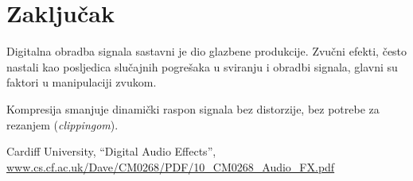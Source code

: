 \documentclass[conference]{IEEEtran}
\begin{document}
\section{Zaključak}
Digitalna obradba signala sastavni je dio glazbene produkcije. Zvučni efekti, često nastali kao
posljedica slučajnih pogrešaka u sviranju i obradbi signala, glavni su faktori u manipulaciji zvukom.

Kompresija smanjuje dinamički raspon signala bez distorzije, bez potrebe za rezanjem
(\textit{clippingom}).

\begin{thebibliography}{00}
 Cardiff University, ``Digital Audio Effects'',
	\url{www.cs.cf.ac.uk/Dave/CM0268/PDF/10_CM0268_Audio_FX.pdf}
\end{thebibliography}
\end{document}
